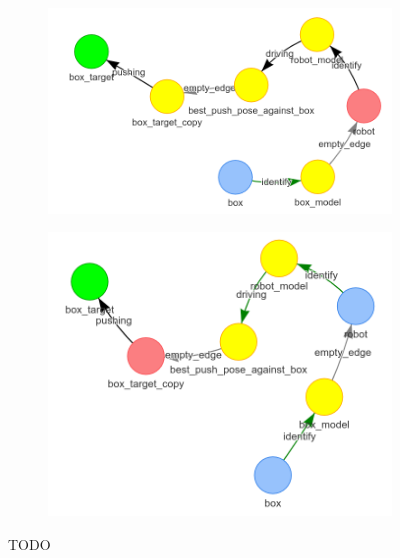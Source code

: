 \begin{figure}[H]
    \centering
    \begin{subfigure}{.3\textwidth}
    \centering
    \includegraphics[width=1\textwidth]{figures/proposed_method/connecting_nodes/robot_push/robot_push_4_new}
    \caption{}\label{subfig:robot_push_4}
    \end{subfigure}
    \begin{subfigure}{.3\textwidth}
    \centering
    \includegraphics[width=1\textwidth]{figures/proposed_method/connecting_nodes/robot_push/robot_push_5_new}
    \caption{}\label{subfig:robot_push_5}
    \end{subfigure}
    \caption{TODO}%
    \label{fig:robot_push_2}
\end{figure}

